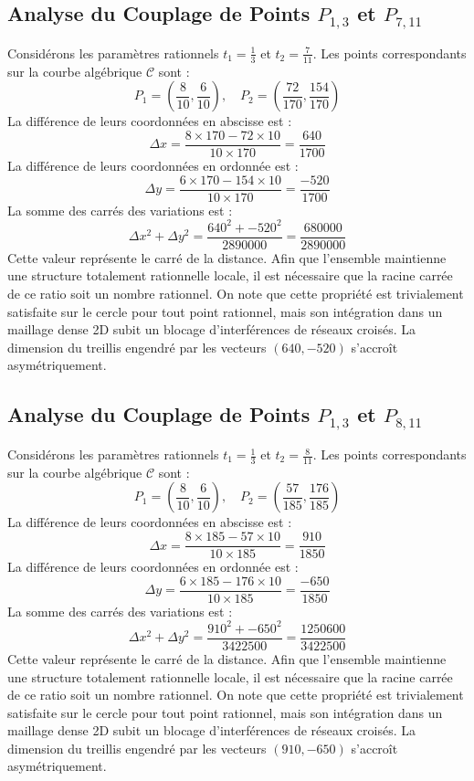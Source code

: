 \documentclass[12pt, a4paper]{article}
\begin{document}
\subsection{Analyse du Couplage de Points $P_{1,3}$ et $P_{7,11}$}
Considérons les paramètres rationnels $t_1 = \frac{1}{3}$ et $t_2 = \frac{7}{11}$.
Les points correspondants sur la courbe algébrique $\mathcal{C}$ sont :
$$ P_1 = \left( \frac{8}{10}, \frac{6}{10} \right), \quad P_2 = \left( \frac{72}{170}, \frac{154}{170} \right) $$
La différence de leurs coordonnées en abscisse est :
$$ \Delta x = \frac{8 \times 170 - 72 \times 10}{10 \times 170} = \frac{640}{1700} $$
La différence de leurs coordonnées en ordonnée est :
$$ \Delta y = \frac{6 \times 170 - 154 \times 10}{10 \times 170} = \frac{-520}{1700} $$
La somme des carrés des variations est :
$$ \Delta x^2 + \Delta y^2 = \frac{ 640^2 + -520^2 }{ 2890000 } = \frac{ 680000 }{ 2890000 } $$
Cette valeur représente le carré de la distance. Afin que l'ensemble maintienne une structure totalement rationnelle locale, il est nécessaire que la racine carrée de ce ratio soit un nombre rationnel. On note que cette propriété est trivialement satisfaite sur le cercle pour tout point rationnel, mais son intégration dans un maillage dense 2D subit un blocage d'interférences de réseaux croisés. La dimension du treillis engendré par les vecteurs $( 640, -520 )$ s'accroît asymétriquement.


\subsection{Analyse du Couplage de Points $P_{1,3}$ et $P_{8,11}$}
Considérons les paramètres rationnels $t_1 = \frac{1}{3}$ et $t_2 = \frac{8}{11}$.
Les points correspondants sur la courbe algébrique $\mathcal{C}$ sont :
$$ P_1 = \left( \frac{8}{10}, \frac{6}{10} \right), \quad P_2 = \left( \frac{57}{185}, \frac{176}{185} \right) $$
La différence de leurs coordonnées en abscisse est :
$$ \Delta x = \frac{8 \times 185 - 57 \times 10}{10 \times 185} = \frac{910}{1850} $$
La différence de leurs coordonnées en ordonnée est :
$$ \Delta y = \frac{6 \times 185 - 176 \times 10}{10 \times 185} = \frac{-650}{1850} $$
La somme des carrés des variations est :
$$ \Delta x^2 + \Delta y^2 = \frac{ 910^2 + -650^2 }{ 3422500 } = \frac{ 1250600 }{ 3422500 } $$
Cette valeur représente le carré de la distance. Afin que l'ensemble maintienne une structure totalement rationnelle locale, il est nécessaire que la racine carrée de ce ratio soit un nombre rationnel. On note que cette propriété est trivialement satisfaite sur le cercle pour tout point rationnel, mais son intégration dans un maillage dense 2D subit un blocage d'interférences de réseaux croisés. La dimension du treillis engendré par les vecteurs $( 910, -650 )$ s'accroît asymétriquement.
\end{document}

